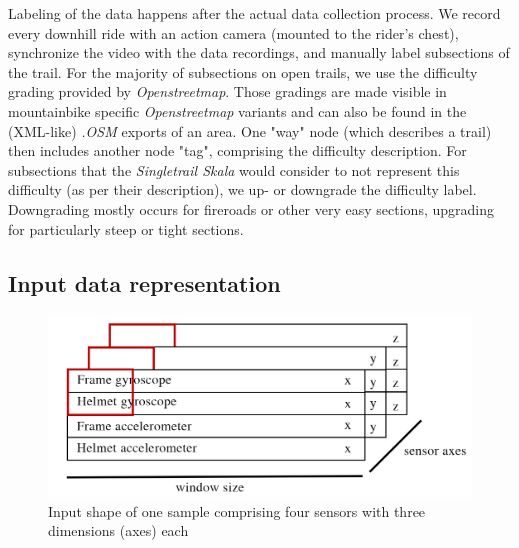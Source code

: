 \documentclass[runningheads]{llncs}
\begin{document}
Labeling of the data happens after the actual data collection process.
We record every downhill ride with an action camera (mounted to the rider's chest), synchronize the video with the data recordings, and manually label subsections of the trail.
For the majority of subsections on open trails, we use the difficulty grading provided by \textit{Openstreetmap}.
Those gradings are made visible in mountainbike specific \textit{Openstreetmap} variants and can also be found in the (XML-like) \textit{.OSM} exports of an area.
One "way" node (which describes a trail) then includes another node "tag", comprising the difficulty description.
For subsections that the \textit{Singletrail Skala} would consider to not represent this difficulty (as per their description), we up- or downgrade the difficulty label.
Downgrading mostly occurs for fireroads or other very easy sections, upgrading for particularly steep or tight sections.

\FloatBarrier

\subsection{Input data representation}

\begin{figure}
\includegraphics[width=\textwidth]{input_shape.png}
\caption{Input shape of one sample comprising four sensors with three dimensions (axes) each}
\label{fig2}	
\end{figure}
\end{document}
